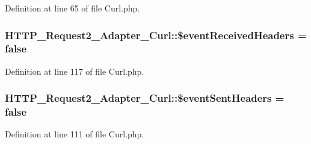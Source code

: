 Definition at line 65 of file Curl.\-php.

\hypertarget{classHTTP__Request2__Adapter__Curl_adfd911404ba9642b18156c7e75c1574f}{
\subsubsection[{\$event\-Received\-Headers}]{\setlength{\rightskip}{0pt plus 5cm}H\-T\-T\-P\-\_\-\-Request2\-\_\-\-Adapter\-\_\-\-Curl\-::\$event\-Received\-Headers = false\hspace{0.3cm}{\ttfamily [protected]}}}\label{classHTTP__Request2__Adapter__Curl_adfd911404ba9642b18156c7e75c1574f}


Definition at line 117 of file Curl.\-php.

\hypertarget{classHTTP__Request2__Adapter__Curl_a7676f5068e7106d115b77107ac9b1531}{
\subsubsection[{\$event\-Sent\-Headers}]{\setlength{\rightskip}{0pt plus 5cm}H\-T\-T\-P\-\_\-\-Request2\-\_\-\-Adapter\-\_\-\-Curl\-::\$event\-Sent\-Headers = false\hspace{0.3cm}{\ttfamily [protected]}}}\label{classHTTP__Request2__Adapter__Curl_a7676f5068e7106d115b77107ac9b1531}


Definition at line 111 of file Curl.\-php.

